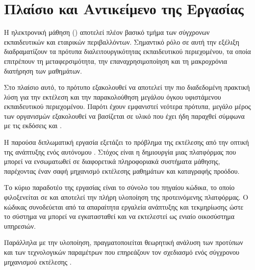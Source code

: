 \section{Πλαίσιο και Αντικείμενο της Εργασίας}

Η ηλεκτρονική μάθηση () αποτελεί πλέον βασικό τμήμα των σύγχρονων εκπαιδευτικών και εταιρικών
περιβαλλόντων. Σημαντικό ρόλο σε αυτή την εξέλιξη διαδραματίζουν τα πρότυπα διαλειτουργικότητας εκπαιδευτικού
περιεχομένου, τα οποία επιτρέπουν τη μεταφερσιμότητα, την επαναχρησιμοποίηση και τη μακροχρόνια διατήρηση των
μαθημάτων.

Στο πλαίσιο αυτό, το πρότυπο  εξακολουθεί να αποτελεί την
πιο διαδεδομένη πρακτική λύση για την εκτέλεση και την παρακολούθηση μεγάλου όγκου υφιστάμενου εκπαιδευτικού
περιεχομένου. Παρότι έχουν εμφανιστεί νεότερα πρότυπα, μεγάλο μέρος των οργανισμών εξακολουθεί να βασίζεται σε
υλικό που έχει ήδη παραχθεί σύμφωνα με τις εκδόσεις  και .

Η παρούσα διπλωματική εργασία εξετάζει το πρόβλημα της εκτέλεσης  από την οπτική της ανάπτυξης ενός
αυτόνομου . Στόχος είναι η δημιουργία μιας πλατφόρμας που μπορεί να ενσωματωθεί σε διαφορετικά
πληροφοριακά συστήματα μάθησης, παρέχοντας έναν σαφή μηχανισμό εκτέλεσης μαθημάτων και καταγραφής προόδου.

Το κύριο παραδοτέο της εργασίας είναι το σύνολο του πηγαίου κώδικα, το οποίο φιλοξενείται σε
 και αποτελεί την πλήρη υλοποίηση της προτεινόμενης πλατφόρμας. Ο κώδικας συνοδεύεται από τα απαραίτητα
εργαλεία ανάπτυξης και τεκμηρίωσης ώστε το σύστημα να μπορεί να εγκατασταθεί και να εκτελεστεί ως ενιαίο
οικοσύστημα υπηρεσιών.

Παράλληλα με την υλοποίηση, πραγματοποιείται θεωρητική ανάλυση των προτύπων  και των τεχνολογικών
παραμέτρων που επηρεάζουν τον σχεδιασμό ενός σύγχρονου μηχανισμού εκτέλεσης .